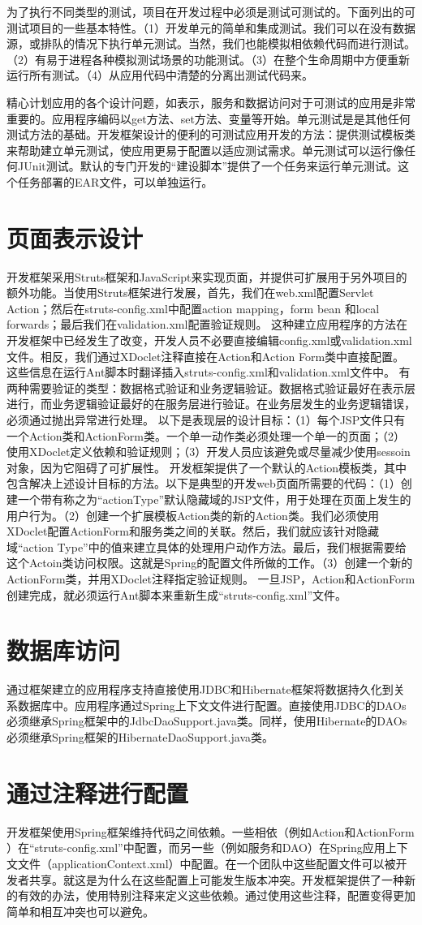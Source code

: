 为了执行不同类型的测试，项目在开发过程中必须是测试可测试的。下面列出的可测试项目的一些基本特性。（1）开发单元的简单和集成测试。我们可以在没有数据源，或排队的情况下执行单元测试。当然，我们也能模拟相依赖代码而进行测试。（2）有易于进程各种模拟测试场景的功能测试。（3）在整个生命周期中方便重新运行所有测试。（4）从应用代码中清楚的分离出测试代码来。

精心计划应用的各个设计问题，如表示，服务和数据访问对于可测试的应用是非常重要的。应用程序编码以get方法、set方法、变量等开始。单元测试是是其他任何测试方法的基础。开发框架设计的便利的可测试应用开发的方法：提供测试模板类来帮助建立单元测试，使应用更易于配置以适应测试需求。单元测试可以运行像任何JUnit测试。默认的专门开发的“建设脚本”提供了一个任务来运行单元测试。这个任务部署的EAR文件，可以单独运行。

\section{页面表示设计}
开发框架采用Struts框架和JavaScript来实现页面，并提供可扩展用于另外项目的额外功能。当使用Struts框架进行发展，首先，我们在web.xml配置Servlet Action；然后在struts-config.xml中配置action mapping，form bean 和local forwards；最后我们在validation.xml配置验证规则。
这种建立应用程序的方法在开发框架中已经发生了改变，开发人员不必要直接编辑config.xml或validation.xml文件。相反，我们通过XDoclet注释直接在Action和Action Form类中直接配置。这些信息在运行Ant脚本时翻译插入struts-config.xml和validation.xml文件中。
有两种需要验证的类型：数据格式验证和业务逻辑验证。数据格式验证最好在表示层进行，而业务逻辑验证最好的在服务层进行验证。在业务层发生的业务逻辑错误，必须通过抛出异常进行处理。
以下是表现层的设计目标：（1）每个JSP文件只有一个Action类和ActionForm类。一个单一动作类必须处理一个单一的页面；（2）使用XDoclet定义依赖和验证规则；（3）开发人员应该避免或尽量减少使用sessoin对象，因为它阻碍了可扩展性。
开发框架提供了一个默认的Action模板类，其中包含解决上述设计目标的方法。以下是典型的开发web页面所需要的代码：（1）创建一个带有称之为“actionType”默认隐藏域的JSP文件，用于处理在页面上发生的用户行为。（2）创建一个扩展模板Action类的新的Action类。我们必须使用XDoclet配置ActionForm和服务类之间的关联。然后，我们就应该针对隐藏域“action Type”中的值来建立具体的处理用户动作方法。最后，我们根据需要给这个Actoin类访问权限。这就是Spring的配置文件所做的工作。（3）创建一个新的ActionForm类，并用XDoclet注释指定验证规则。
一旦JSP，Action和ActionForm创建完成，就必须运行Ant脚本来重新生成“struts-config.xml”文件。
\section{数据库访问}
通过框架建立的应用程序支持直接使用JDBC和Hibernate框架将数据持久化到关系数据库中。应用程序通过Spring上下文文件进行配置。直接使用JDBC的DAOs必须继承Spring框架中的JdbcDaoSupport.java类。同样，使用Hibernate的DAOs必须继承Spring框架的HibernateDaoSupport.java类。

\section{通过注释进行配置}
开发框架使用Spring框架维持代码之间依赖。一些相依（例如Action和ActionForm ）在“struts-config.xml”中配置，而另一些（例如服务和DAO）在Spring应用上下文文件（applicationContext.xml）中配置。在一个团队中这些配置文件可以被开发者共享。就这是为什么在这些配置上可能发生版本冲突。开发框架提供了一种新的有效的办法，使用特别注释来定义这些依赖。通过使用这些注释，配置变得更加简单和相互冲突也可以避免。
